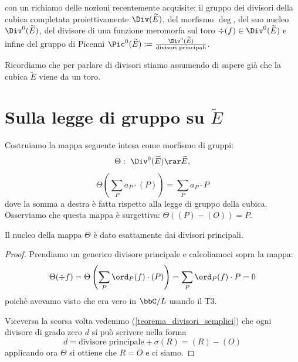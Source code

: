 
 con un richiamo delle nozioni recentemente acquisite: il gruppo dei divisori della cubica completata proiettivamente $\Div(\widetilde{E})$, del morfismo $\deg$, del suo nucleo $\Div^0(\widetilde{E})$, del divisore di una funzione meromorfa sul toro $\div(f)\in\Div^0(\widetilde{E})$ e infine del gruppo di Picenni $\Pic^0(\widetilde{E}) := \frac{\Div^0(\widetilde{E})}{\text{divisori principali}}$.

Ricordiamo che per parlare di divisori stiamo assumendo di sapere già che la cubica $\widetilde{E}$ viene da un toro.

\section{Sulla legge di gruppo su $\widetilde{E}$}
Costruiamo la mappa seguente intesa come morfismo di gruppi:
$$
\Theta: \ \Div^0(\widetilde{E})\rar \widetilde{E},
$$
$$
\Theta\left(\sum_P a_P \cdot (P)\right)=\sum_P a_P \cdot P
$$
dove la somma a destra è fatta rispetto alla legge di gruppo della cubica.
Osserviamo che questa mappa è surgettiva: $\Theta((P)-(O))=P$.


\begin{lemma}
Il nucleo della mappa $\Theta$ è dato esattamente dai divisori principali.
\end{lemma}
\begin{proof}
Prendiamo un generico divisore principale e calcoliamoci sopra la mappa:
$$
\Theta(\div f)=\Theta\left(\sum_P \ord_P(f) \cdot (P)\right)=\sum_P \ord_P(f)\cdot P=0
$$
poichè avevamo visto che era vero in $\bbC/L$ usando il T3.

Viceversa la scorsa volta vedemmo (\ref{teorema_divisori_semplici}) che ogni divisore di grado zero $d$ si può scrivere nella forma
$$ d = \mbox{divisore principale} + \sigma(R) = (R) - (O) $$
applicando ora $\Theta$ si ottiene che $R=O$ e ci siamo.
\end{proof}


